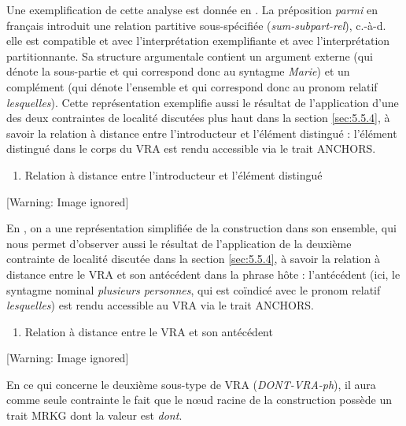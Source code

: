 Une exemplification de cette analyse est donnée en . La préposition \textit{parmi} en français introduit une relation partitive sous-spécifiée (\textit{sum-subpart-rel}), c.-à-d. elle est compatible et avec l'interprétation exemplifiante et avec l'interprétation partitionnante. Sa structure argumentale contient un argument externe (qui dénote la sous-partie et qui correspond donc au syntagme \textit{Marie}) et un complément (qui dénote l'ensemble et qui correspond donc au pronom relatif \textit{lesquelles}).  Cette représentation exemplifie aussi le résultat de l'application d'une des deux contraintes de localité discutées plus haut dans la section \ref{sec:5.5.4}, à savoir la relation à distance entre l'introducteur et l'élément distingué : l'élément distingué dans le corps du VRA est rendu accessible via le trait ANCHORS.


\begin{enumerate}
\item \label{bkm:Ref299031436}Relation à distance entre l'introducteur et l'élément distingué


\end{enumerate}
  [Warning: Image ignored] %
 

En , on a une représentation simplifiée de la construction dans son ensemble, qui nous permet d'observer aussi le résultat de l'application de la deuxième contrainte de localité discutée dans la section \ref{sec:5.5.4}, à savoir la relation à distance entre le VRA et son antécédent dans la phrase hôte : l'antécédent (ici, le syntagme nominal \textit{plusieurs personnes}, qui est coïndicé avec le pronom relatif \textit{lesquelles})  est rendu accessible au VRA via le trait ANCHORS. 


\begin{enumerate}
\item \label{bkm:Ref299032355}Relation à distance entre le VRA et son antécédent


\end{enumerate}
  [Warning: Image ignored] %
 

En ce qui concerne le deuxième sous-type de VRA (\textit{DONT-VRA-ph}), il aura comme seule contrainte le fait que le n{\oe}ud racine de la construction possède un trait MRKG dont la valeur est \textit{dont}.


